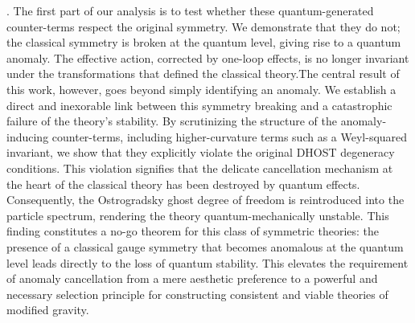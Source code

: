 \documentclass[twocolumn]{aastex631}
\begin{document}
\citep{ferrero2025oneloopeffectiveactioncoherent}. The first part of our analysis is to test whether these quantum-generated counter-terms respect the original symmetry. We demonstrate that they do not; the classical symmetry is broken at the quantum level, giving rise to a quantum anomaly. The effective action, corrected by one-loop effects, is no longer invariant under the transformations that defined the classical theory.The central result of this work, however, goes beyond simply identifying an anomaly. We establish a direct and inexorable link between this symmetry breaking and a catastrophic failure of the theory's stability. By scrutinizing the structure of the anomaly-inducing counter-terms, including higher-curvature terms such as a Weyl-squared invariant, we show that they explicitly violate the original DHOST degeneracy conditions. This violation signifies that the delicate cancellation mechanism at the heart of the classical theory has been destroyed by quantum effects. Consequently, the Ostrogradsky ghost degree of freedom is reintroduced into the particle spectrum, rendering the theory quantum-mechanically unstable. This finding constitutes a no-go theorem for this class of symmetric theories: the presence of a classical gauge symmetry that becomes anomalous at the quantum level leads directly to the loss of quantum stability. This elevates the requirement of anomaly cancellation from a mere aesthetic preference to a powerful and necessary selection principle for constructing consistent and viable theories of modified gravity.
\end{document}
